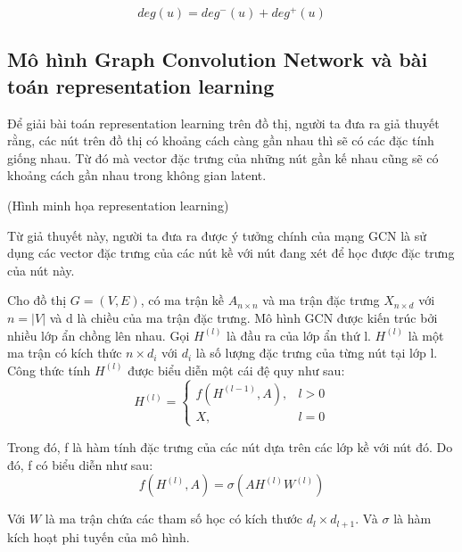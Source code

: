 \begin{equation*}
	deg(u) = deg^-(u) + deg^+(u)
\end{equation*}

\subsection{Mô hình Graph Convolution Network và bài toán representation learning}

Để giải bài toán representation learning trên đồ thị, người ta đưa ra giả thuyết rằng, các nút trên đồ thị có khoảng cách càng gần nhau thì sẽ có các đặc tính giống nhau. Từ đó mà vector đặc trưng của những nút gần kế nhau cũng sẽ có khoảng cách gần nhau trong không gian latent.

(Hình minh họa representation learning)

Từ giả thuyết này, người ta đưa ra được ý tưởng chính của mạng GCN là sử dụng các vector đặc trưng của các nút kề với nút đang xét để học được đặc trưng của nút này.

Cho đồ thị $G = (V,E)$, có ma trận kề $A_{n \times n}$ và ma trận đặc trưng $X_{n \times d}$ với $n = |V|$ và d là chiều của ma trận đặc trưng. Mô hình GCN được kiến trúc bởi nhiều lớp ẩn chồng lên nhau. Gọi $H^{(l)}$ là đầu ra của lớp ẩn thứ l. $H^{(l)}$ là một ma trận có kích thức $n \times d_i$ với $d_i$ là số lượng đặc trưng của từng nút tại lớp l. Công thức tính $H^{(l)}$ được biểu diễn một cái đệ quy như sau:
\begin{equation*}
	H^{(l)} = 
	\begin{cases}
		f(H^{(l-1)}, A), & l > 0 \\
		X, & l = 0		
	\end{cases}
\end{equation*}

Trong đó, f là hàm tính đặc trưng của các nút dựa trên các lớp kề với nút đó. Do đó, f có biểu diễn như sau:
\begin{equation*}
	f(H^{(l)}, A) = \sigma(AH^{(l)}W^{(l)})
\end{equation*}

Với $W$ là ma trận chứa các tham số học có kích thước $d_l \times d_{l+1}$. Và $\sigma$ là hàm kích hoạt phi tuyến của mô hình. 

